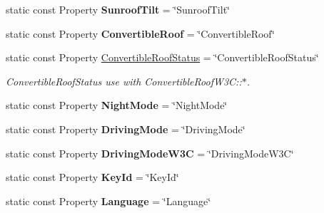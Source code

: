 \begin{DoxyCompactItemize}
\item 
\hypertarget{classVehicleProperty_aaa5b7fe1aa9c1df58285370a2223a9a7}{static const Property {\bfseries Sunroof\+Tilt} = \char`\"{}Sunroof\+Tilt\char`\"{}}\label{classVehicleProperty_aaa5b7fe1aa9c1df58285370a2223a9a7}

\item 
\hypertarget{classVehicleProperty_ac81ed60b4ae5140288191380470aa6fe}{static const Property {\bfseries Convertible\+Roof} = \char`\"{}Convertible\+Roof\char`\"{}}\label{classVehicleProperty_ac81ed60b4ae5140288191380470aa6fe}

\item 
\hypertarget{classVehicleProperty_a8b8ea675ff9353b181bd051beacc217e}{static const Property \hyperlink{classVehicleProperty_a8b8ea675ff9353b181bd051beacc217e}{Convertible\+Roof\+Status} = \char`\"{}Convertible\+Roof\+Status\char`\"{}}\label{classVehicleProperty_a8b8ea675ff9353b181bd051beacc217e}

\begin{DoxyCompactList}\small\item\em Convertible\+Roof\+Status use with Convertible\+Roof\+W3\+C\+:\+:$\ast$. \end{DoxyCompactList}\item 
\hypertarget{classVehicleProperty_af85dc0e35b81d1ce30818c0dc2cbde94}{static const Property {\bfseries Night\+Mode} = \char`\"{}Night\+Mode\char`\"{}}\label{classVehicleProperty_af85dc0e35b81d1ce30818c0dc2cbde94}

\item 
\hypertarget{classVehicleProperty_a4b68af6a7539a07a2be7438bd6ced9f0}{static const Property {\bfseries Driving\+Mode} = \char`\"{}Driving\+Mode\char`\"{}}\label{classVehicleProperty_a4b68af6a7539a07a2be7438bd6ced9f0}

\item 
\hypertarget{classVehicleProperty_a54cf61b61a0d1929e729454c834d3cf2}{static const Property {\bfseries Driving\+Mode\+W3\+C} = \char`\"{}Driving\+Mode\+W3\+C\char`\"{}}\label{classVehicleProperty_a54cf61b61a0d1929e729454c834d3cf2}

\item 
\hypertarget{classVehicleProperty_ab4e37b9cd6be99aa50f009cf8b26f8ae}{static const Property {\bfseries Key\+Id} = \char`\"{}Key\+Id\char`\"{}}\label{classVehicleProperty_ab4e37b9cd6be99aa50f009cf8b26f8ae}

\item 
\hypertarget{classVehicleProperty_a715e47aac9daf8a45e34f8379f722c36}{static const Property {\bfseries Language} = \char`\"{}Language\char`\"{}}\label{classVehicleProperty_a715e47aac9daf8a45e34f8379f722c36}


\end{DoxyCompactItemize}
